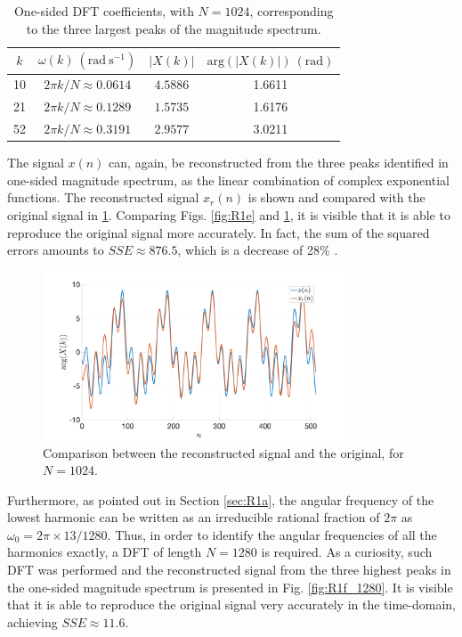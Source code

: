 \documentclass[]{scrartcl}
\begin{document}
\begin{table}[htbp]
	\centering
	\caption{One-sided DFT coefficients, with $N = 1024$, corresponding to the three largest peaks of the magnitude spectrum.}
	\label{tb:peaks_N}
	\begin{tabular}{cccc}
		\hline
		$k$ & $\omega(k) \: (\mathrm{rad\:s^{-1}})$ & $|X(k)|$ & $\mathrm{arg}(|X(k)|)\: (\mathrm{rad})$\\
		\hline
		10 & $2\pi k/N \approx 0.0614$ & $ 4.5886$ & 1.6611\\
		21 & $2\pi k/N \approx 0.1289$ & $ 1.5735$ & 1.6176 \\
		52  & $2\pi k/N \approx 0.3191$ & $ 2.9577$ & 3.0211 \\
		\hline
	\end{tabular}
\end{table}


The signal $x(n)$ can, again, be reconstructed from the three peaks identified in one-sided magnitude spectrum, as the linear combination of complex exponential functions. The reconstructed signal $x_r(n)$ is shown and compared with the original signal in \ref{fig:R1f}. Comparing Figs. \ref{fig:R1e} and \ref{fig:R1f}, it is visible that it is able to reproduce the original signal more accurately. In fact, the sum of the squared errors amounts to $SSE \approx 876.5$, which is a decrease of 28\% .

\begin{figure}[htbp]
	\centering
	\includegraphics[width= 0.8\textwidth]{figures/R1f.png}
	\caption{Comparison between the reconstructed signal and the original, for $N = 1024$.}
	\label{fig:R1f}
\end{figure}

Furthermore, as pointed out in Section \ref{sec:R1a}, the angular frequency of the lowest harmonic can be written as an irreducible rational fraction of $2\pi$ as $\omega_0 = 2\pi \times 13/1280$. Thus, in order to identify the angular frequencies of all the harmonics exactly, a DFT of length $N = 1280$ is required. As a curiosity, such DFT was performed and the reconstructed signal from the three highest peaks in the one-sided magnitude spectrum is presented in Fig. \ref{fig:R1f_1280}. It is visible that it is able to reproduce the original signal very accurately in the time-domain, achieving $SSE \approx 11.6$.
\end{document}
